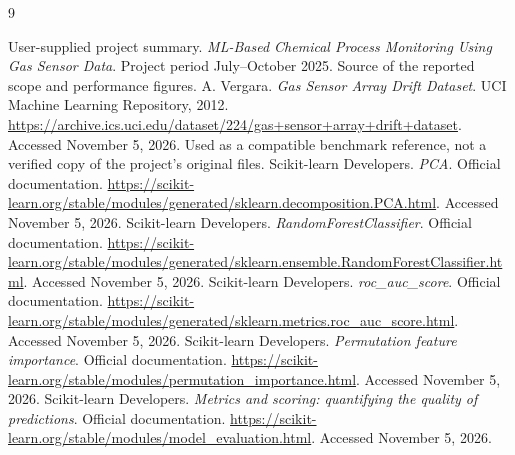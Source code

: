 \documentclass[11pt,a4paper]{article}
\begin{document}
\clearpage\begin{thebibliography}{9}
 User-supplied project summary. \emph{ML-Based Chemical Process Monitoring Using Gas Sensor Data}. Project period July--October 2025. Source of the reported scope and performance figures.
 A. Vergara. \emph{Gas Sensor Array Drift Dataset}. UCI Machine Learning Repository, 2012. \url{https://archive.ics.uci.edu/dataset/224/gas+sensor+array+drift+dataset}. Accessed November 5, 2026. Used as a compatible benchmark reference, not a verified copy of the project's original files.
 Scikit-learn Developers. \emph{PCA}. Official documentation. \url{https://scikit-learn.org/stable/modules/generated/sklearn.decomposition.PCA.html}. Accessed November 5, 2026.
 Scikit-learn Developers. \emph{RandomForestClassifier}. Official documentation. \url{https://scikit-learn.org/stable/modules/generated/sklearn.ensemble.RandomForestClassifier.html}. Accessed November 5, 2026.
 Scikit-learn Developers. \emph{roc\_auc\_score}. Official documentation. \url{https://scikit-learn.org/stable/modules/generated/sklearn.metrics.roc_auc_score.html}. Accessed November 5, 2026.
 Scikit-learn Developers. \emph{Permutation feature importance}. Official documentation. \url{https://scikit-learn.org/stable/modules/permutation_importance.html}. Accessed November 5, 2026.
 Scikit-learn Developers. \emph{Metrics and scoring: quantifying the quality of predictions}. Official documentation. \url{https://scikit-learn.org/stable/modules/model_evaluation.html}. Accessed November 5, 2026.
\end{thebibliography}
\end{document}
